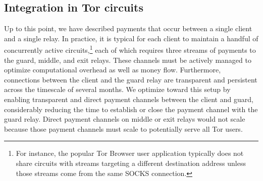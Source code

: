 \subsection{Integration in Tor circuits}

Up to this point, we have described payments that occur between a single client and a single relay.
In practice, it is typical for each client to maintain a handful of concurrently active circuits,\footnote{For instance, the popular Tor Browser user application typically does not share circuits with streams targeting a different destination address unless those streams come from the same SOCKS connection.}
each of which requires three streams of payments to the guard, middle, and exit relays.
These channels must be actively managed to optimize computational overhead as well as money flow.
Furthermore, connections between the client and the guard relay are transparent and persistent across the timescale of several months.
We optimize toward this setup by enabling transparent and direct payment channels between the client and guard, considerably reducing the time to establish or close the payment channel with the guard relay.
Direct payment channels on middle or exit relays would not scale because those payment channels must scale to potentially serve all Tor users.

